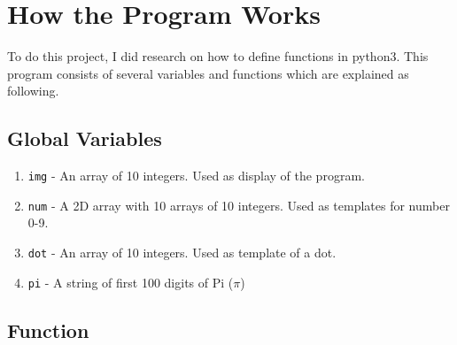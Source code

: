 \documentclass[12pt]{article}
\begin{document}
\section{How the Program Works}\label{sec:how}

	To do this project, I did research on how to define functions in python3. This program consists of several variables and functions which are explained as following.

	\subsection{Global Variables}

		\begin{enumerate}
			\item \texttt{img} - An array of 10 integers. Used as display of the program.
			\item \texttt{num} - A 2D array with 10 arrays of 10 integers. Used as templates for number 0-9.
			\item \texttt{dot} - An array of 10 integers. Used as template of a dot.
			\item \texttt{pi} - A string of first 100 digits of Pi ($\pi$)
		\end{enumerate}

	\subsection{Function}
\end{document}

